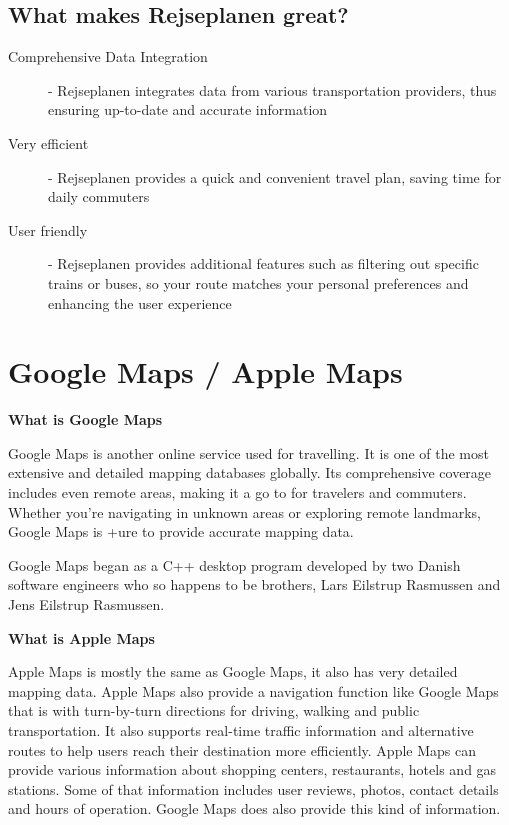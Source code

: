 \documentclass[11pt]{article}
\begin{document}
    \subsection{What makes Rejseplanen great?}\label{subsec:what-makes-rejseplanen-great?}
    \begin{description}
        \item [Comprehensive Data Integration] - Rejseplanen integrates data from various transportation providers, thus ensuring up-to-date and accurate information
        \item [Very efficient] - Rejseplanen provides a quick and convenient travel plan, saving time for daily commuters
        \item [User friendly] - Rejseplanen provides additional features such as filtering out specific trains or buses, so your route matches your personal preferences and enhancing the user experience
    \end{description}


    \section{Google Maps / Apple Maps}\label{sec:google-maps-/-apple-maps}

    \textbf{What is Google Maps}

    Google Maps is another online service used for travelling.
    It is one of the most extensive and detailed mapping databases globally.
    Its comprehensive coverage includes even remote areas, making it a go to for travelers and commuters.
    Whether you're navigating in unknown areas or exploring remote landmarks, Google Maps is +ure to provide accurate
    mapping data.\cite{GoogleMaps} \newline

    Google Maps began as a C++ desktop program developed by two Danish software engineers who so happens to be brothers,
    Lars Eilstrup Rasmussen and Jens Eilstrup Rasmussen.\cite{GoogleMaps} \newline

    \textbf{What is Apple Maps}

    Apple Maps is mostly the same as Google Maps, it also has very detailed mapping data.
    Apple Maps also provide a navigation function like Google Maps that is with turn-by-turn directions for driving,
    walking and public transportation.
    It also supports real-time traffic information and alternative routes to help users reach their destination more
    efficiently.
    Apple Maps can provide various information about shopping centers, restaurants, hotels and gas stations.
    Some of that information includes user reviews, photos, contact details and hours of operation.
    Google Maps does also provide this kind of information. \newline
\end{document}
